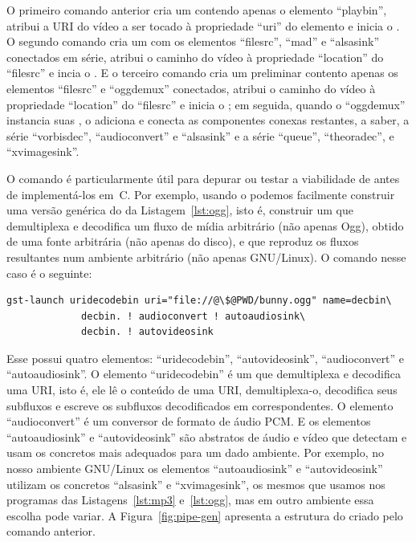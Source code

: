 \documentclass{SBCbookchapter}
\begin{document}
O primeiro comando anterior cria um  contendo apenas o elemento
``playbin'', atribui a URI do vídeo a ser tocado à propriedade ``uri'' do
elemento e inicia o .  O segundo comando cria um 
com os elementos ``filesrc'', ``mad'' e ``alsasink'' conectados em série,
atribui o caminho do vídeo à propriedade ``location'' do ``filesrc'' e incia
o .  E o terceiro comando cria um  preliminar
contento apenas os elementos ``filesrc'' e ``oggdemux'' conectados, atribui
o caminho do vídeo à propriedade ``location'' do ``filesrc'' e inicia o
; em seguida, quando o ``oggdemux'' instancia suas
, o  adiciona e conecta as componentes
conexas restantes, a saber, a série ``vorbisdec'', ``audioconvert'' e
``alsasink'' e a série ``queue'', ``theoradec'', e ``xvimagesink''.

O comando  é particularmente útil para depurar ou testar a
viabilidade de  antes de implementá-los em~C\null.  Por
exemplo, usando o  podemos facilmente construir uma versão
genérica do  da Listagem~\ref{lst:ogg}, isto é, construir um
 que demultiplexa e decodifica um fluxo de mídia arbitrário
(não apenas Ogg), obtido de uma fonte arbitrária (não apenas do disco), e
que reproduz os fluxos resultantes num ambiente arbitrário (não apenas
GNU/Linux).  O comando nesse caso é o seguinte:
\begin{lstlisting}[style=command]
gst-launch uridecodebin uri="file://@\$@PWD/bunny.ogg" name=decbin\
             decbin. ! audioconvert ! autoaudiosink\
             decbin. ! autovideosink
\end{lstlisting}

Esse  possui quatro elementos: ``uridecodebin'',
``autovideosink'', ``audioconvert'' e ``autoaudiosink''.  O elemento
``uridecodebin'' é um \en{bin} que demultiplexa e decodifica uma URI, isto
é, ele lê o conteúdo de uma URI, demultiplexa-o, decodifica seus subfluxos e
escreve os subfluxos decodificados em \en{sometimes pads} correspondentes.
O elemento ``audioconvert'' é um conversor de formato de áudio PCM\null.
E os elementos ``autoaudiosink'' e ``autovideosink'' são \en{sinks}
abstratos de áudio e vídeo que detectam e usam os  concretos mais
adequados para um dado ambiente.  Por exemplo, no nosso ambiente GNU/Linux
os elementos ``autoaudiosink'' e ``autovideosink'' utilizam os \en{sinks}
concretos ``alsasink'' e ``xvimagesink'', os mesmos que usamos nos programas
das Listagens~\ref{lst:mp3} e~\ref{lst:ogg}, mas em outro ambiente essa
escolha pode variar.  A Figura~\ref{fig:pipe-gen} apresenta a estrutura do
\en{pipeline} criado pelo comando \en{gst-launch} anterior.
\end{document}
